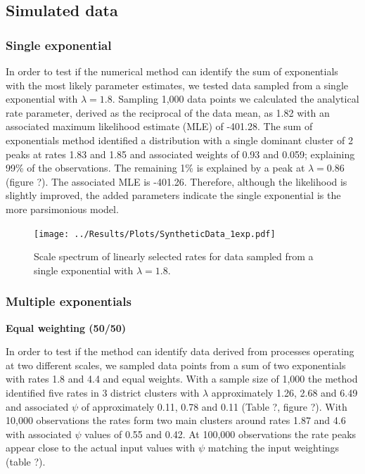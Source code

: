 \documentclass[11pt,usenames,dvipsnames]{article}
\begin{document}
\noindent
\subsection{Simulated data}

\subsubsection{Single exponential}
In order to test if the numerical method can identify the sum of exponentials with the most likely parameter estimates, we tested data sampled from a single exponential with $\lambda = 1.8$. Sampling 1,000 data points we calculated the analytical rate parameter, derived as the reciprocal of the data mean, as 1.82 with an associated maximum likelihood estimate (MLE) of -401.28. The sum of exponentials method identified a distribution with a single dominant cluster of 2 peaks at rates 1.83 and 1.85 and associated weights of 0.93 and 0.059; explaining 99\% of the observations. The remaining 1\% is explained by a peak at $\lambda = 0.86$ (figure ?). The associated MLE is -401.26. Therefore, although the likelihood is slightly improved, the added parameters indicate the single exponential is the more parsimonious model.

\begin{figure}[H]
	\centering
	\texttt{[image: ../Results/Plots/SyntheticData\_1exp.pdf]}
	\caption{Scale spectrum of linearly selected rates for data sampled from a single exponential with $\lambda = 1.8$.}
\end{figure}


\subsubsection{Multiple exponentials}

\noindent
\textbf{Equal weighting (50/50)}

In order to test if the method can identify data derived from processes operating at two different scales, we sampled data points from a sum of two exponentials with rates 1.8 and 4.4 and equal weights. With a sample size of 1,000 the method identified five rates in 3 district clusters with $\lambda$ approximately 1.26, 2.68 and 6.49 and associated $\psi$ of approximately 0.11, 0.78 and 0.11 (Table ?, figure ?). With 10,000 observations the rates form two main clusters around rates 1.87 and 4.6 with associated $\psi$ values of 0.55 and 0.42. At 100,000 observations the rate peaks appear close to the actual input values with $\psi$ matching the input weightings (table ?). 
\end{document}
